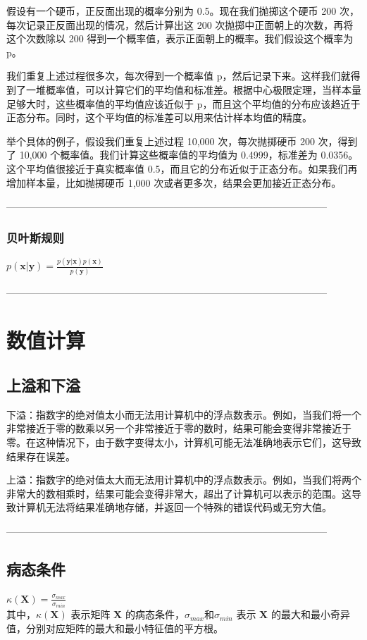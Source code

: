 \documentclass{article}
\begin{document}
假设有一个硬币，正反面出现的概率分别为 0.5。现在我们抛掷这个硬币 200 次，每次记录正反面出现的情况，然后计算出这 200 次抛掷中正面朝上的次数，再将这个次数除以 200 得到一个概率值，表示正面朝上的概率。我们假设这个概率为 p。

我们重复上述过程很多次，每次得到一个概率值 p，然后记录下来。这样我们就得到了一堆概率值，可以计算它们的平均值和标准差。根据中心极限定理，当样本量足够大时，这些概率值的平均值应该近似于 p，而且这个平均值的分布应该趋近于正态分布。同时，这个平均值的标准差可以用来估计样本均值的精度。

举个具体的例子，假设我们重复上述过程 10,000 次，每次抛掷硬币 200 次，得到了 10,000 个概率值。我们计算这些概率值的平均值为 0.4999，标准差为 0.0356。这个平均值很接近于真实概率值 0.5，而且它的分布近似于正态分布。如果我们再增加样本量，比如抛掷硬币 1,000 次或者更多次，结果会更加接近正态分布。


--------------------------------------------------------------------------------------------------
\subsubsection{贝叶斯规则}
$ p(\mathbf{x} | \mathbf{y}) = \frac{p(\mathbf{y} | \mathbf{x})p(\mathbf{x})}{p(\mathbf{y})} $

--------------------------------------------------------------------------------------------------

\section{数值计算}
\subsection{上溢和下溢}

下溢：指数字的绝对值太小而无法用计算机中的浮点数表示。例如，当我们将一个非常接近于零的数乘以另一个非常接近于零的数时，结果可能会变得非常接近于零。在这种情况下，由于数字变得太小，计算机可能无法准确地表示它们，这导致结果存在误差。

上溢：指数字的绝对值太大而无法用计算机中的浮点数表示。例如，当我们将两个非常大的数相乘时，结果可能会变得非常大，超出了计算机可以表示的范围。这导致计算机无法将结果准确地存储，并返回一个特殊的错误代码或无穷大值。

--------------------------------------------------------------------------------------------------
\subsection{病态条件}
$ \kappa(\mathbf{X}) = \frac{\sigma_{max}}{\sigma_{min}} $  \\
其中，$ \kappa(\mathbf{X}) $ 表示矩阵 $\mathbf{X}$ 的病态条件，$\sigma_{max}​$和$\sigma_{min}​$ 表示 $\mathbf{X}$ 的最大和最小奇异值，分别对应矩阵的最大和最小特征值的平方根。
\end{document}
